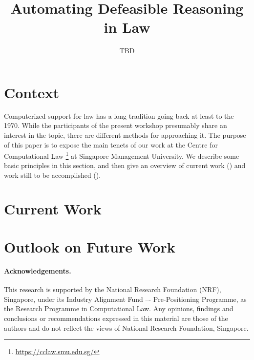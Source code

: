 \documentclass[runningheads]{llncs}
\begin{document}
\title{Automating Defeasible Reasoning in Law}

\author{TBD
  }
\maketitle

\begin{abstract}

\end{abstract}



\section{Context}\label{sec:context}

Computerized support for law has a long tradition going back at least to the
1970. While the participants of the present workshop presumably share an
interest in the topic, there are different methods for approaching it. The
purpose of this paper is to expose the main tenets of our work at the Centre
for Computational Law \footnote{\url{https://cclaw.smu.edu.sg/}} at Singapore
Management University. We describe some basic principles in this section, and
then give an overview of current work () and work
still to be accomplished ().




\section{Current Work}\label{sec:current_work}

\section{Outlook on Future Work}\label{sec:outlook}




\paragraph{Acknowledgements.}
This research is supported by the National Research Foundation (NRF),
Singapore, under its Industry Alignment Fund –- Pre-Positioning Programme, as
the Research Programme in Computational Law. Any opinions, findings and
conclusions or recommendations expressed in this material are those of the
authors and do not reflect the views of National Research Foundation,
Singapore.

% 
% 


\end{document}
